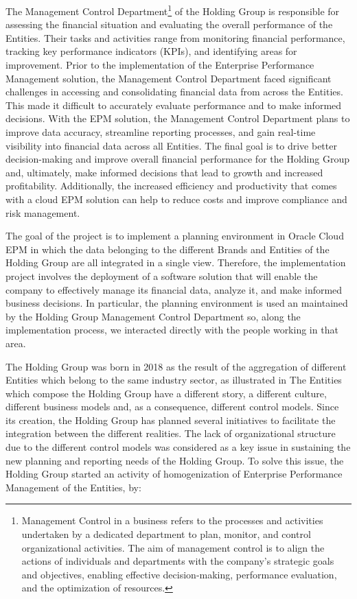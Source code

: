 \documentclass[12pt,a4paper,openright,twoside]{book}
\begin{document}
The Management Control Department\footnote{Management Control in a business refers to the processes and activities undertaken by a dedicated department to plan, monitor, and control organizational activities. The aim of management control is to align the actions of individuals and departments with the company's strategic goals and objectives, enabling effective decision-making, performance evaluation, and the optimization of resources.} of the Holding Group is responsible for assessing the financial situation and evaluating the overall performance of the Entities.
%
Their tasks and activities range from monitoring financial performance, tracking key performance indicators (KPIs), and identifying areas for improvement.
%
Prior to the implementation of the Enterprise Performance Management solution, the Management Control Department faced significant challenges in accessing and consolidating financial data from across the Entities.
%
This made it difficult to accurately evaluate performance and to make informed decisions.
%
With the EPM solution, the Management Control Department plans to improve data accuracy, streamline reporting processes, and gain real-time visibility into financial data across all Entities. 
%
The final goal is to drive better decision-making and improve overall financial performance for the Holding Group and, ultimately, make informed decisions that lead to growth and increased profitability. 
%
Additionally, the increased efficiency and productivity that comes with a cloud EPM solution can help to reduce costs and improve compliance and risk management.

The goal of the project is to implement a planning environment in Oracle Cloud EPM in which the data belonging to the different Brands and Entities of the Holding Group are all integrated in a single view.
%
Therefore, the implementation project involves the deployment of a software solution that will enable the company to effectively manage its financial data, analyze it, and make informed business decisions.
%
In particular, the planning environment is used an maintained by the Holding Group Management Control Department so, along the implementation process, we interacted directly with the people working in that area.

The Holding Group was born in 2018 as the result of the aggregation of different Entities which belong to the same industry sector, as illustrated in 
%
The Entities which compose the Holding Group have a different story, a different culture, different business models and, as a consequence, different control models.
%
Since its creation, the Holding Group has planned several initiatives to facilitate the integration between the different realities.
%
The lack of organizational structure due to the different control models was considered as a key issue in sustaining the new planning and reporting needs of the Holding Group.
%
To solve this issue, the Holding Group started an activity of homogenization of Enterprise Performance Management of the Entities, by:
\end{document}
